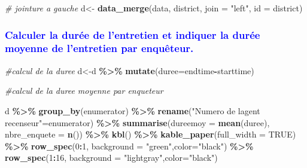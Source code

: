 \documentclass[
]{article}
\newenvironment{Shaded}{\begin{snugshade}}{\end{snugshade}}
\newcommand{\AttributeTok}[1]{\textcolor[rgb]{0.13,0.29,0.53}{#1}}
\newcommand{\CommentTok}[1]{\textcolor[rgb]{0.56,0.35,0.01}{\textit{#1}}}
\newcommand{\ConstantTok}[1]{\textcolor[rgb]{0.56,0.35,0.01}{#1}}
\newcommand{\DecValTok}[1]{\textcolor[rgb]{0.00,0.00,0.81}{#1}}
\newcommand{\FunctionTok}[1]{\textcolor[rgb]{0.13,0.29,0.53}{\textbf{#1}}}
\newcommand{\NormalTok}[1]{#1}
\newcommand{\OtherTok}[1]{\textcolor[rgb]{0.56,0.35,0.01}{#1}}
\newcommand{\SpecialCharTok}[1]{\textcolor[rgb]{0.81,0.36,0.00}{\textbf{#1}}}
\newcommand{\StringTok}[1]{\textcolor[rgb]{0.31,0.60,0.02}{#1}}
\begin{document}
\begin{Shaded}
\begin{Highlighting}[]
\CommentTok{\# jointure a gauche}
\NormalTok{d}\OtherTok{\textless{}{-}} \FunctionTok{data\_merge}\NormalTok{(data, district, }\AttributeTok{join =} \StringTok{"left"}\NormalTok{, }\AttributeTok{id =}\NormalTok{ district)}
\end{Highlighting}
\end{Shaded}

\textcolor{blue}{\subsubsection{ Calculer la durée de l'entretien et indiquer la durée moyenne de l'entretien par enquêteur.}}

\hfill\break

\begin{Shaded}
\begin{Highlighting}[]
\CommentTok{\#calcul de la duree}
\NormalTok{d}\OtherTok{\textless{}{-}}\NormalTok{d }\SpecialCharTok{\%\textgreater{}\%} 
     \FunctionTok{mutate}\NormalTok{(}\AttributeTok{duree=}\NormalTok{endtime}\SpecialCharTok{{-}}\NormalTok{starttime)}

\CommentTok{\#calcul de la duree moyenne par enqueteur}

\NormalTok{d }\SpecialCharTok{\%\textgreater{}\%}
  \FunctionTok{group\_by}\NormalTok{(enumerator) }\SpecialCharTok{\%\textgreater{}\%} 
     \FunctionTok{rename}\NormalTok{(}\StringTok{"Numero de l\textquotesingle{}agent recenseur"}\OtherTok{=}\NormalTok{enumerator) }\SpecialCharTok{\%\textgreater{}\%} 
        \FunctionTok{summarise}\NormalTok{(}\AttributeTok{dureemoy =} \FunctionTok{mean}\NormalTok{(duree), }\AttributeTok{nbre\_enquete =} \FunctionTok{n}\NormalTok{()) }\SpecialCharTok{\%\textgreater{}\%} 
          \FunctionTok{kbl}\NormalTok{() }\SpecialCharTok{\%\textgreater{}\%}
          \FunctionTok{kable\_paper}\NormalTok{(}\AttributeTok{full\_width =} \ConstantTok{TRUE}\NormalTok{) }\SpecialCharTok{\%\textgreater{}\%}
          \FunctionTok{row\_spec}\NormalTok{(}\DecValTok{0}\SpecialCharTok{:}\DecValTok{1}\NormalTok{, }\AttributeTok{background =} \StringTok{"green"}\NormalTok{,}\AttributeTok{color=}\StringTok{"black"}\NormalTok{) }\SpecialCharTok{\%\textgreater{}\%} 
          \FunctionTok{row\_spec}\NormalTok{(}\DecValTok{1}\SpecialCharTok{:}\DecValTok{16}\NormalTok{, }\AttributeTok{background =} \StringTok{"lightgray"}\NormalTok{,}\AttributeTok{color=}\StringTok{"black"}\NormalTok{)}
\end{Highlighting}
\end{Shaded}
\end{document}
